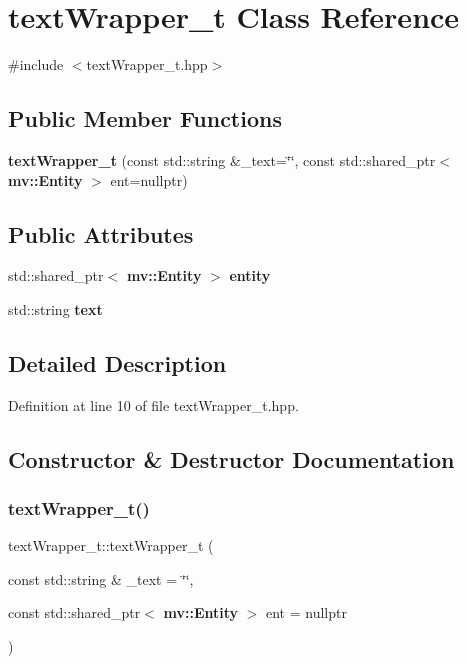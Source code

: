 \section{text\+Wrapper\+\_\+t Class Reference}
\label{classtext_wrapper__t}


{\ttfamily \#include $<$text\+Wrapper\+\_\+t.\+hpp$>$}

\subsection*{Public Member Functions}
\begin{DoxyCompactItemize}
\item 
\textbf{ text\+Wrapper\+\_\+t} (const std\+::string \&\+\_\+text=\char`\"{}\char`\"{}, const std\+::shared\+\_\+ptr$<$ \textbf{ mv\+::\+Entity} $>$ ent=nullptr)
\end{DoxyCompactItemize}
\subsection*{Public Attributes}
\begin{DoxyCompactItemize}
\item 
std\+::shared\+\_\+ptr$<$ \textbf{ mv\+::\+Entity} $>$ \textbf{ entity}
\item 
std\+::string \textbf{ text}
\end{DoxyCompactItemize}


\subsection{Detailed Description}


Definition at line 10 of file text\+Wrapper\+\_\+t.\+hpp.



\subsection{Constructor \& Destructor Documentation}
\mbox{\label{classtext_wrapper__t_ac6deabaeda554cb7fb689f0d61ad7289}} 
\subsubsection{text\+Wrapper\+\_\+t()}
{\footnotesize\ttfamily text\+Wrapper\+\_\+t\+::text\+Wrapper\+\_\+t (\begin{DoxyParamCaption}\item[{const std\+::string \&}]{\+\_\+text = {\ttfamily \char`\"{}\char`\"{}},  }\item[{const std\+::shared\+\_\+ptr$<$ \textbf{ mv\+::\+Entity} $>$}]{ent = {\ttfamily nullptr} }\end{DoxyParamCaption})\hspace{0.3cm}{\ttfamily [inline]}}



